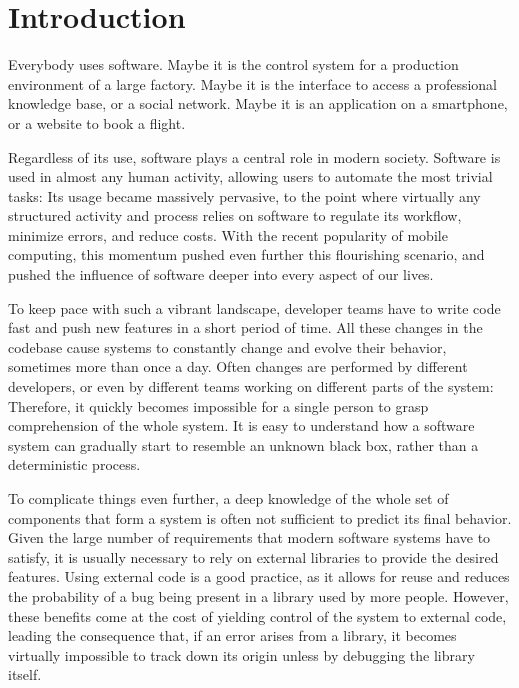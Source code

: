 
\chapter{Introduction}\label{ch:introduction}

Everybody uses software.
Maybe it is the control system for a production environment of a large factory.
Maybe it is the interface to access a professional knowledge base, or a social network.
Maybe it is an application on a smartphone, or a website to book a flight.

Regardless of its use, software plays a central role in modern society.
Software is used in almost any human activity, allowing users to automate the most trivial tasks: Its usage became massively pervasive, to the point where virtually any structured activity and process relies on software to regulate its workflow, minimize errors, and reduce costs.
With the recent popularity of mobile computing, this momentum pushed even further this flourishing scenario, and pushed the influence of software deeper into every aspect of our lives.

To keep pace with such a vibrant landscape, developer teams have to write code fast and push new features in a short period of time.
All these changes in the codebase cause systems to constantly change and evolve their behavior, sometimes more than once a day.
Often changes are performed by different developers, or even by different teams working on different parts of the system: Therefore, it quickly becomes impossible for a single person to grasp comprehension of the whole system.
It is easy to understand how a software system can gradually start to resemble an unknown black box, rather than a deterministic process.

To complicate things even further, a deep knowledge of the whole set of components that form a system is often not sufficient to predict its final behavior.
Given the large number of requirements that modern software systems have to satisfy, it is usually necessary to rely on external libraries to provide the desired features.
Using external code is a good practice, as it allows for reuse and reduces the probability of a bug being present in a library used by more people.
However, these benefits come at the cost of yielding control of the system to external code, leading the consequence that, if an error arises from a library, it becomes virtually impossible to track down its origin unless by debugging the library itself.


